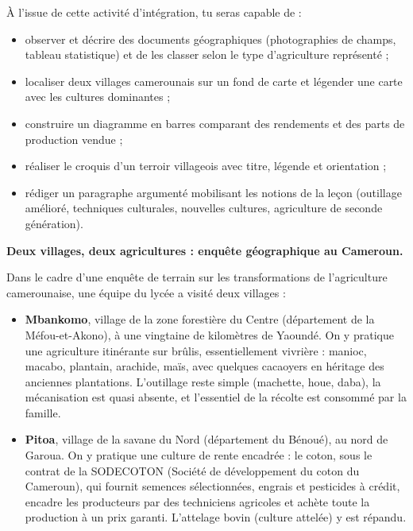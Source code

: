 \documentclass[11pt]{article}
\newcommand{\cle}[1]{{\popxbold\color{popdark}#1}}
\newcounter{popsec}
\newcounter{popsub}
\newcommand{\courssub}[1]{%
  \stepcounter{popsub}%
  \par\vspace{9pt}\noindent{\popxbold\fontsize{11.5}{13}\selectfont\color{popink}{\color{poporange}\thepopsec.\thepopsub}\hspace{6pt}#1}\par\nopagebreak\vspace{4pt}
}
\begin{document}
À l'issue de cette activité d'intégration, tu seras capable de :
\begin{itemize}
\item \cle{observer} et \cle{décrire} des documents géographiques (photographies de champs, tableau statistique) et de les \cle{classer} selon le type d'agriculture représenté ;
\item \cle{localiser} deux villages camerounais sur un fond de carte et \cle{légender} une carte avec les cultures dominantes ;
\item \cle{construire} un diagramme en barres comparant des rendements et des parts de production vendue ;
\item \cle{réaliser} le croquis d'un terroir villageois avec titre, légende et orientation ;
\item \cle{rédiger} un paragraphe argumenté mobilisant les notions de la leçon (outillage amélioré, techniques culturales, nouvelles cultures, agriculture de seconde génération).
\end{itemize}

\courssub{Situation}

\textbf{Deux villages, deux agricultures : enquête géographique au Cameroun.}

Dans le cadre d'une enquête de terrain sur les transformations de l'agriculture camerounaise, une équipe du lycée a visité deux villages :

\begin{itemize}
\item \textbf{Mbankomo}, village de la zone forestière du Centre (département de la Méfou-et-Akono), à une vingtaine de kilomètres de Yaoundé. On y pratique une agriculture itinérante sur brûlis, essentiellement vivrière : manioc, macabo, plantain, arachide, maïs, avec quelques cacaoyers en héritage des anciennes plantations. L'outillage reste simple (machette, houe, daba), la mécanisation est quasi absente, et l'essentiel de la récolte est consommé par la famille.
\item \textbf{Pitoa}, village de la savane du Nord (département du Bénoué), au nord de Garoua. On y pratique une culture de rente encadrée : le coton, sous le contrat de la \cle{SODECOTON} (Société de développement du coton du Cameroun), qui fournit semences sélectionnées, engrais et pesticides à crédit, encadre les producteurs par des techniciens agricoles et achète toute la production à un prix garanti. L'attelage bovin (culture attelée) y est répandu.
\end{itemize}
\end{document}
